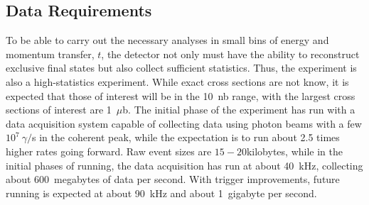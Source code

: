 \subsection{Data Requirements \label{sec:intro:data_requirements}}
To be able to carry out the necessary analyses in small bins of energy and momentum transfer, $t$, the detector not only must have the ability to reconstruct exclusive final states but also collect sufficient statistics. Thus, the \GX{} experiment is also a high-statistics experiment. While exact cross sections are not know, it is expected that those of interest will be in the 10~nb range, with the largest cross sections of interest are 1~$\mu$b. The initial phase of the \GX{} experiment has run with a data acquisition system capable of collecting data using photon beams with a few $10^{7}~\gamma/$s in the coherent peak, while the expectation is to run about 2.5 times higher rates going forward. Raw event sizes are $15-20$kilobytes, while in the initial phases of running, the data acquisition has run at about 40~kHz, collecting about 600~megabytes of data per second. With trigger improvements, future running is expected at about 90~kHz and about 1~gigabyte per second.  